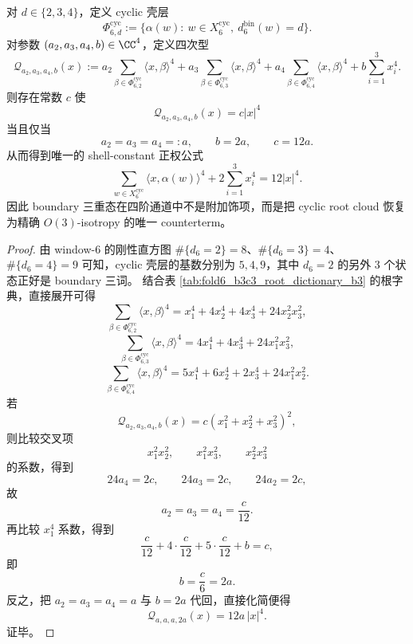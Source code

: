 \begin{theorem}\label{thm:window6-visible-quartic-shell-isotropization}
对 \(d\in\{2,3,4\}\)，定义 cyclic 壳层
\[
\Phi_{6,d}^{\mathrm{cyc}}
:=
\{\alpha(w):\ w\in X_6^{\mathrm{cyc}},\ d_6^{\mathrm{bin}}(w)=d\}.
\]
对参数 \((a_2,a_3,a_4,b)\in \CC^4\)，定义四次型
\[
\mathcal Q_{a_2,a_3,a_4,b}(x):=
a_2\sum_{\beta\in \Phi_{6,2}^{\mathrm{cyc}}}\langle x,\beta\rangle^4
+
a_3\sum_{\beta\in \Phi_{6,3}^{\mathrm{cyc}}}\langle x,\beta\rangle^4
+
a_4\sum_{\beta\in \Phi_{6,4}^{\mathrm{cyc}}}\langle x,\beta\rangle^4
+
b\sum_{i=1}^{3}x_i^4.
\]
则存在常数 \(c\) 使
\[
\mathcal Q_{a_2,a_3,a_4,b}(x)=c|x|^4
\]
当且仅当
\[
a_2=a_3=a_4=:a,
\qquad
b=2a,
\qquad
c=12a.
\]
从而得到唯一的 shell-constant 正权公式
\[
\sum_{w\in X_6^{\mathrm{cyc}}}\langle x,\alpha(w)\rangle^4
+
2\sum_{i=1}^{3}x_i^4
=
12|x|^4.
\]
因此 boundary 三重态在四阶通道中不是附加饰项，而是把 cyclic root cloud 恢复为精确 \(O(3)\)-isotropy 的唯一 counterterm。
\end{theorem}
\begin{proof}
由 window-\(6\) 的刚性直方图 \(\#\{d_6=2\}=8\)、\(\#\{d_6=3\}=4\)、\(\#\{d_6=4\}=9\) 可知，cyclic 壳层的基数分别为 \(5,4,9\)，其中 \(d_6=2\) 的另外 \(3\) 个状态正好是 boundary 三词。
结合表 \ref{tab:fold6_b3c3_root_dictionary_b3} 的根字典，直接展开可得
\[
\sum_{\beta\in\Phi_{6,2}^{\mathrm{cyc}}}\langle x,\beta\rangle^4
=
x_1^4+4x_2^4+4x_3^4+24x_2^2x_3^2,
\]
\[
\sum_{\beta\in\Phi_{6,3}^{\mathrm{cyc}}}\langle x,\beta\rangle^4
=
4x_1^4+4x_3^4+24x_1^2x_3^2,
\]
\[
\sum_{\beta\in\Phi_{6,4}^{\mathrm{cyc}}}\langle x,\beta\rangle^4
=
5x_1^4+6x_2^4+2x_3^4+24x_1^2x_2^2.
\]
若
\[
\mathcal Q_{a_2,a_3,a_4,b}(x)=c(x_1^2+x_2^2+x_3^2)^2,
\]
则比较交叉项
\[
x_1^2x_2^2,\qquad x_1^2x_3^2,\qquad x_2^2x_3^2
\]
的系数，得到
\[
24a_4=2c,\qquad 24a_3=2c,\qquad 24a_2=2c,
\]
故
\[
a_2=a_3=a_4=\frac{c}{12}.
\]
再比较 \(x_1^4\) 系数，得到
\[
\frac{c}{12}+4\cdot\frac{c}{12}+5\cdot\frac{c}{12}+b=c,
\]
即
\[
b=\frac{c}{6}=2a.
\]
反之，把 \(a_2=a_3=a_4=a\) 与 \(b=2a\) 代回，直接化简便得
\[
\mathcal Q_{a,a,a,2a}(x)=12a\,|x|^4.
\]
证毕。
\end{proof}

